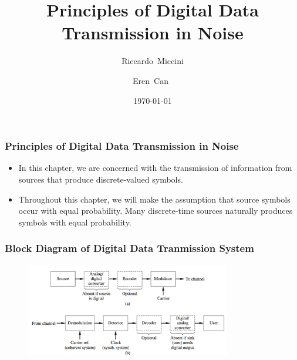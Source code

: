 \documentclass{beamer}
\title{Principles of Digital Data Transmission in Noise}
\subtitle{}
\author[Riccardo \and Eren]{Riccardo~Miccini\inst{1} \and Eren~Can~\inst{1}}
\institute[DTU]
{
	\inst{1}
	Technical University of Denmark\\
	Digital Communication
}
\date{\today}
\begin{document}
	\frame{\titlepage}
	\begin{frame}
		\frametitle{Principles of Digital Data Transmission in Noise}
	\begin{itemize}
	\item In this chapter, we are concerned with the transmission of information from sources that produce discrete-valued symbols.
	\item	 Throughout this chapter, we will make the assumption that source symbols occur with equal probability. Many discrete-time sources naturally produces symbols with equal probability.
	\end{itemize}
	\end{frame}
	\begin{frame}
		\frametitle{Block Diagram of  Digital Data Tranmission System}
		\begin{figure}
		\includegraphics[width=0.8\textwidth]{figure-text7.png}
		\end{figure}
		\end{frame}
\end{document}

